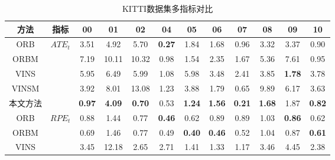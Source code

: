 \begin{table}
\centering
\begin{threeparttable}
\caption{KITTI数据集多指标对比}
\begin{tabular}{c|c|cccccccccc}
\toprule
方法    & 指标                    & 00            & 01            & 02            & 04            & 05            & 06            & 07            & 08            & 09            & 10            \\ \midrule
ORB   & \multirow{5}{*}{$ATE_t$\textdownarrow{}}  & 3.51          & 4.92          & 5.70          & \cellcolor[HTML]{FA7F6F}\textbf{0.27} & 1.84          & 1.68          & 0.96          & 3.32          & 3.37          & 0.90          \\
ORBM  &                       & 7.19          & 10.11         & 10.32         & 0.98          & 1.54          & 2.35          & 1.67          & 5.36          & 7.61          & 0.95          \\
VINS  &                       & 5.95          & 6.49          & 5.99          & 1.08          & 5.98          & 3.48          & 2.41          & 3.85          & \cellcolor[HTML]{FA7F6F}\textbf{1.78}          & 3.78          \\
VINSM &                       & 3.92          & 8.01          & 13.08         & 1.23          & 3.88          & 1.79          & 0.65          & 9.89          & 6.17          & 3.63          \\
本文方法    &                       & \cellcolor[HTML]{FA7F6F}\textbf{0.97} & \cellcolor[HTML]{FA7F6F}\textbf{4.09} & \cellcolor[HTML]{FA7F6F}\textbf{0.70} & 0.53          & \cellcolor[HTML]{FA7F6F}\textbf{1.24} & \cellcolor[HTML]{FA7F6F}\textbf{1.56} & \cellcolor[HTML]{FA7F6F}\textbf{0.21} & \cellcolor[HTML]{FA7F6F}\textbf{1.68} & 1.87 & \cellcolor[HTML]{FA7F6F}\textbf{0.82} \\ \midrule
ORB   & \multirow{5}{*}{$RPE_t$\textdownarrow{}} & 0.88          & 1.44          & 0.77          & \cellcolor[HTML]{FA7F6F}\textbf{0.46} & 0.62          & 0.89          & 0.89          & 1.03          & \cellcolor[HTML]{FA7F6F}\textbf{0.86} & 0.62          \\
ORBM  &                       & 0.69          & 1.46          & 0.77          & 0.49          & \cellcolor[HTML]{FA7F6F}\textbf{0.40} & \cellcolor[HTML]{FA7F6F}\textbf{0.46} & 0.52          & 1.04          & 0.87          & \cellcolor[HTML]{FA7F6F}\textbf{0.61} \\
VINS  &                       & 3.45          & 12.18         & 2.65          & 2.71          & 1.41          & 1.33          & 1.17          & 3.46          & 4.45          & 2.38          \\

\end{tabular}
\end{threeparttable}
\end{table}

